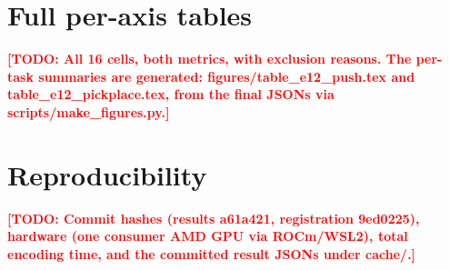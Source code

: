 \documentclass[10pt]{article}
\newcommand{\TODO}[1]{\textcolor{red}{\textbf{[TODO: #1]}}}
\begin{document}
\section{Full per-axis tables}\label{app:tables}
\TODO{All 16 cells, both metrics, with exclusion reasons. The per-task
summaries are generated: figures/table\_e12\_push.tex and
table\_e12\_pickplace.tex, from the final JSONs via scripts/make\_figures.py.}
\section{Reproducibility}\label{app:repro}
\TODO{Commit hashes (results a61a421, registration 9ed0225), hardware (one
consumer AMD GPU via ROCm/WSL2), total encoding time, and the committed
result JSONs under cache/.}
\end{document}
